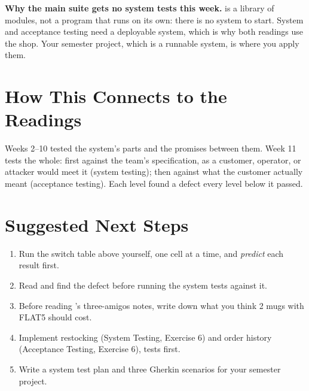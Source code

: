 \documentclass[11pt]{article}
\begin{document}
\begin{warningbox}
\textbf{Why the main suite gets no system tests this week.}
 is a library of modules, not a program that runs on its
own: there is no system to start. System and acceptance testing need a
deployable system, which is why both readings use the shop. Your
semester project, which is a runnable system, is where you apply them.
\end{warningbox}

\section{How This Connects to the Readings}
\begin{keyidea}
Weeks 2--10 tested the system's parts and the promises between them.
Week 11 tests the whole: first against the team's specification, as a
customer, operator, or attacker would meet it (system testing); then
against what the customer actually meant (acceptance testing). Each
level found a defect every level below it passed.
\end{keyidea}

\section{Suggested Next Steps}
\begin{enumerate}
\item Run the switch table above yourself, one cell at a time, and
\emph{predict} each result first.
\item Read  and find the defect before running
the system tests against it.
\item Before reading 's three-amigos notes,
write down what you think 2 mugs with FLAT5 should cost.
\item Implement restocking (System Testing, Exercise 6) and order
history (Acceptance Testing, Exercise 6), tests first.
\item Write a system test plan and three Gherkin scenarios for your
semester project.
\end{enumerate}
\end{document}
